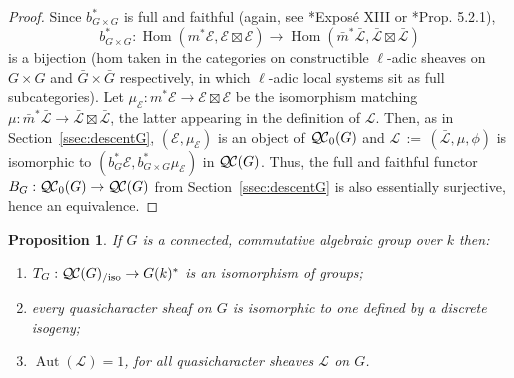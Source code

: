 \documentclass[CM,Submssn,SecEq]{degruyter-crelle} %
\theoremstyle{plain}
\newtheorem{proposition}[theorem]{Proposition}
\theoremstyle{definition}
\theoremstyle{remark}
\newcommand{\Fq}{k}
\DeclareMathOperator{\Aut}{Aut}
\DeclareMathOperator{\Hom}{Hom}
\newcommand{\ceq}{{\, :=\, }}
\newcommand{\TrFrob}[1]{T_{#1}}
\newcommand{\qcs}[1]{{\mathcal{#1}}}
\newcommand{\gqcs}[1]{{\mathcal{\bar #1}}}
\newcommand{\QC}{{\mathcal{Q\hskip-0.8pt C}}}
\newcommand{\bQC}{{\QC_0}}
\newcommand{\QCiso}[1]{\QC(#1)_{/\text{iso}}}
\begin{document}
\begin{proof}
  Since $b_{G\times G}^*$ is full and faithful (again, see
\cite{deligne-katz:SGA7.2}*{Expos\'e XIII} or \cite{beilinson-bernstein-deligne:81a}*{Prop. 5.2.1}),
 \[
  b_{G\times G}^* : \Hom(m^*\qcs{E},\qcs{E}\boxtimes\qcs{E}) \to \Hom({\bar m}^*\gqcs{L},\gqcs{L}\boxtimes\gqcs{L})
 \]
  is a bijection
  (hom taken in the categories on constructible $\ell$-adic sheaves on
  $G\times G$ and ${\bar G}\times {\bar G}$ respectively,
  in which $\ell$-adic local systems sit as full subcategories).
  Let $\mu_\qcs{E} : m^*\qcs{E} \to \qcs{E}\boxtimes\qcs{E}$ be the isomorphism matching
  $\mu : {\bar m}^*\gqcs{L} \to \gqcs{L}\boxtimes\gqcs{L}$,
  the latter appearing in the definition of $\qcs{L}$.
  Then, as in Section~\ref{ssec:descentG}, $(\qcs{E},\mu_\qcs{E})$ is an object of $\bQC(G)$
  and $\qcs{L} \ceq (\gqcs{L},\mu,\phi)$ is isomorphic to $(b_G^*\qcs{E},b_{G\times G}^*\mu_\qcs{E})$ in $\QC(G)$.
  Thus, the full and faithful functor $B_G : \bQC(G) \to \QC(G)$ from Section~\ref{ssec:descentG}
  is also essentially surjective, hence an equivalence.
\end{proof}

\begin{proposition}\label{prop:connected}
 If $G$ is a connected, commutative algebraic group over $\Fq$ then:
 \begin{enumerate}
 \item $\TrFrob{G} : \QCiso{G} \to G(\Fq)^*$ is an isomorphism of groups;
 \item every quasicharacter sheaf on $G$ is isomorphic to one defined by a discrete isogeny;%
 \item $\Aut(\qcs{L}) = 1$, for all quasicharacter sheaves $\qcs{L}$ on $G$.
 \end{enumerate}
 \end{proposition}
\end{document}
